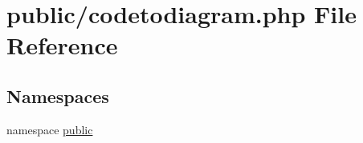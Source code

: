 \hypertarget{codetodiagram_8php}{
\section{public/codetodiagram.php File Reference}
\label{codetodiagram_8php}
}
\subsection*{Namespaces}
\begin{CompactItemize}
\item 
namespace \hyperlink{namespacepublic}{public}
\end{CompactItemize}
